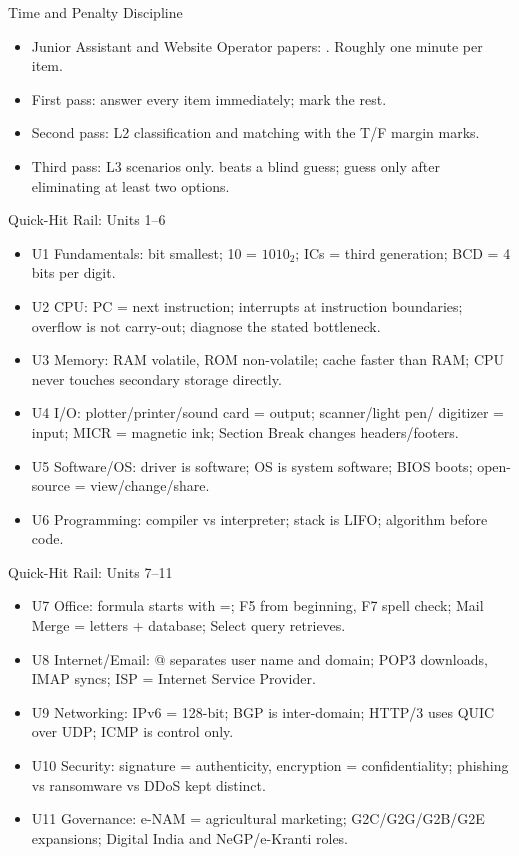\documentclass[aspectratio=169]{beamer}
\begin{document}
\begin{frame}{Time and Penalty Discipline}
  \begin{itemize}
    \item Junior Assistant and Website Operator papers: . Roughly one minute per item.
    \item First pass: answer every  item immediately; mark
      the rest.
    \item Second pass: L2 classification and matching with the T/F margin
      marks.
    \item Third pass: L3 scenarios only.  beats a blind guess;
      guess only after eliminating at least two options.
  \end{itemize}
\end{frame}

\begin{frame}{Quick-Hit Rail: Units 1--6}
  \begin{itemize}
    \item U1 Fundamentals: bit smallest; 10 = $1010_2$; ICs = third
      generation; BCD = 4 bits per digit.
    \item U2 CPU: PC = next instruction; interrupts at instruction
      boundaries; overflow is not carry-out; diagnose the stated bottleneck.
    \item U3 Memory: RAM volatile, ROM non-volatile; cache faster than RAM;
      CPU never touches secondary storage directly.
    \item U4 I/O: plotter/printer/sound card = output; scanner/light pen/
      digitizer = input; MICR = magnetic ink; Section Break changes
      headers/footers.
    \item U5 Software/OS: driver is software; OS is system software; BIOS
      boots; open-source = view/change/share.
    \item U6 Programming: compiler vs interpreter; stack is LIFO; algorithm
      before code.
  \end{itemize}
\end{frame}

\begin{frame}{Quick-Hit Rail: Units 7--11}
  \begin{itemize}
    \item U7 Office: formula starts with =; F5 from beginning, F7 spell
      check; Mail Merge = letters + database; Select query retrieves.
    \item U8 Internet/Email: @ separates user name and domain; POP3
      downloads, IMAP syncs; ISP = Internet Service Provider.
    \item U9 Networking: IPv6 = 128-bit; BGP is inter-domain; HTTP/3 uses
      QUIC over UDP; ICMP is control only.
    \item U10 Security: signature = authenticity, encryption =
      confidentiality; phishing vs ransomware vs DDoS kept distinct.
    \item U11 Governance: e-NAM = agricultural marketing; G2C/G2G/G2B/G2E
      expansions; Digital India and NeGP/e-Kranti roles.
  \end{itemize}
\end{frame}
\end{document}
